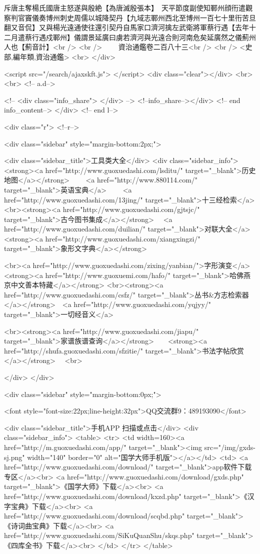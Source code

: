 斥唐主奪楊氏國唐主怒遂與殷絶【為唐滅殷張本】　天平節度副使知鄆州顔衎遣觀察判官竇儀奏博州刺史周儒以城降契丹【九域志鄆州西北至博州一百七十里衎苦旦翻又音侃】又與楊光遠通使往還引契丹自馬家口濟河擒左武衛將軍蔡行遇【去年十二月遣蔡行遇戍鄆州】儀謂景延廣曰虜若濟河與光遠合則河南危矣延廣然之儀薊州人也【薊音計】<br />
<br />
　　資治通鑑卷二百八十三<br />
<br />
<史部,編年類,資治通鑑>  <br>
   </div> 

<script src="/search/ajaxskft.js"> </script>
 <div class="clear"></div>
<br>
<br>
 <!-- a.d-->

 <!--
<div class="info_share">
</div> 
-->
 <!--info_share--></div>   <!-- end info_content-->
  </div> <!-- end l-->

<div class="r">   <!--r-->



<div class="sidebar"  style="margin-bottom:2px;">

 
<div class="sidebar_title">工具类大全</div>
<div class="sidebar_info">
<strong><a href="http://www.guoxuedashi.com/lsditu/" target="_blank">历史地图</a></strong>　　
<a href="http://www.880114.com/" target="_blank">英语宝典</a>　　
<a href="http://www.guoxuedashi.com/13jing/" target="_blank">十三经检索</a>　
<br><strong><a href="http://www.guoxuedashi.com/gjtsjc/" target="_blank">古今图书集成</a></strong>　
<a href="http://www.guoxuedashi.com/duilian/" target="_blank">对联大全</a>　<strong><a href="http://www.guoxuedashi.com/xiangxingzi/" target="_blank">象形文字典</a></strong>　

<br><a href="http://www.guoxuedashi.com/zixing/yanbian/">字形演变</a>　　<strong><a href="http://www.guoxuemi.com/hafo/" target="_blank">哈佛燕京中文善本特藏</a></strong>
<br><strong><a href="http://www.guoxuedashi.com/csfz/" target="_blank">丛书&方志检索器</a></strong>　<a href="http://www.guoxuedashi.com/yqjyy/" target="_blank">一切经音义</a>　　

<br><strong><a href="http://www.guoxuedashi.com/jiapu/" target="_blank">家谱族谱查询</a></strong>　　<strong><a href="http://shufa.guoxuedashi.com/sfzitie/" target="_blank">书法字帖欣赏</a></strong>　
<br>

</div>
</div>


<div class="sidebar" style="margin-bottom:0px;">

<font style="font-size:22px;line-height:32px">QQ交流群9：489193090</font>


<div class="sidebar_title">手机APP 扫描或点击</div>
<div class="sidebar_info">
<table>
<tr>
	<td width=160><a href="http://m.guoxuedashi.com/app/" target="_blank"><img src="/img/gxds-sj.png" width="140"  border="0" alt="国学大师手机版"></a></td>
	<td>
<a href="http://www.guoxuedashi.com/download/" target="_blank">app软件下载专区</a><br>
<a href="http://www.guoxuedashi.com/download/gxds.php" target="_blank">《国学大师》下载</a><br>
<a href="http://www.guoxuedashi.com/download/kxzd.php" target="_blank">《汉字宝典》下载</a><br>
<a href="http://www.guoxuedashi.com/download/scqbd.php" target="_blank">《诗词曲宝典》下载</a><br>
<a href="http://www.guoxuedashi.com/SiKuQuanShu/skqs.php" target="_blank">《四库全书》下载</a><br>
</td>
</tr>
</table>

